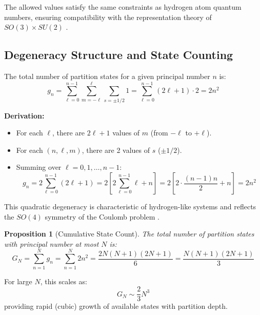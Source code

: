 \documentclass[twocolumn,10pt]{article}
\newtheorem{proposition}[theorem]{Proposition}
\theoremstyle{remark}
\begin{document}
The allowed values satisfy the same constraints as hydrogen atom quantum numbers, ensuring compatibility with the representation theory of $SO(3) \times SU(2)$ \cite{hall2015}.

\subsection{Degeneracy Structure and State Counting}

The total number of partition states for a given principal number $n$ is:
\begin{equation}
    g_n = \sum_{\ell=0}^{n-1} \sum_{m=-\ell}^{\ell} \sum_{s=\pm 1/2} 1 = \sum_{\ell=0}^{n-1} (2\ell+1) \cdot 2 = 2n^2
    \label{eq:degeneracy}
\end{equation}

\textbf{Derivation:}
\begin{itemize}
    \item For each $\ell$, there are $2\ell + 1$ values of $m$ (from $-\ell$ to $+\ell$).
    \item For each $(n, \ell, m)$, there are 2 values of $s$ ($\pm 1/2$).
    \item Summing over $\ell = 0, 1, \ldots, n-1$:
    \begin{equation}
        g_n = 2 \sum_{\ell=0}^{n-1} (2\ell + 1) = 2 \left[2 \sum_{\ell=0}^{n-1} \ell + n\right] = 2\left[2 \cdot \frac{(n-1)n}{2} + n\right] = 2n^2
    \end{equation}
\end{itemize}

This quadratic degeneracy is characteristic of hydrogen-like systems and reflects the $SO(4)$ symmetry of the Coulomb problem \cite{pauli1926}.

\begin{proposition}[Cumulative State Count]
\label{prop:cumulative_states}
The total number of partition states with principal number at most $N$ is:
\begin{equation}
    G_N = \sum_{n=1}^{N} g_n = \sum_{n=1}^{N} 2n^2 = \frac{2N(N+1)(2N+1)}{6} = \frac{N(N+1)(2N+1)}{3}
    \label{eq:cumulative_states}
\end{equation}
\end{proposition}

For large $N$, this scales as:
\begin{equation}
    G_N \sim \frac{2}{3}N^3
    \label{eq:cubic_scaling}
\end{equation}
providing rapid (cubic) growth of available states with partition depth.
\end{document}
